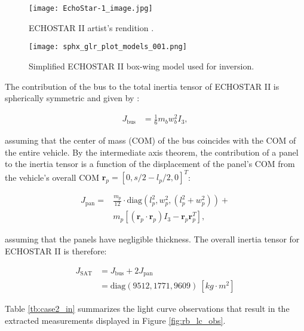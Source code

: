 \documentclass[a4paper,twocolumn]{spaceDebrisC} %
\newcommand{\vctr}[1]{\bm{#1}}
\newcommand{\figbig}[0]{0.5\textwidth}
\begin{document}
\begin{figure}[H]
  \centering
  \texttt{[image: EchoStar-1\_image.jpg]}
  \caption{ECHOSTAR II artist's rendition \cite{as7000_astronautix}.}
  \label{fig:echostar1}
\end{figure}

\begin{figure}[H]
  \centering
  \texttt{[image: sphx\_glr\_plot\_models\_001.png]}
  \caption{Simplified ECHOSTAR II box-wing model used for inversion.}
  \label{fig:echostar1_simple}
\end{figure}

The contribution of the bus to the total inertia tensor of ECHOSTAR II is spherically symmetric and given by \cite{satterly1958}:

\begin{align}
 J_\text{bus} &= \frac{1}{6} m_b w_b^2 I_3,
\end{align}

\noindent
assuming that the center of mass (COM) of the bus coincides with the COM of the entire vehicle. By the intermediate axis theorem, the contribution of a panel to the inertia tensor is a function of the displacement of the panel's COM from the vehicle's overall COM $\vctr{r}_p = [ 0, s/2 - l_p/2, 0]^T$:

\begin{equation}
  \begin{split}
 J_\text{pan} = &\frac{m_p}{12} \cdot \text{diag}\left(l_p^2, w_p^2, \left(l_p^2 + w_p^2\right) \right) + \\&m_p \left[ \left( \vctr{r}_p \cdot \vctr{r}_p \right) I_3 - \vctr{r}_p \vctr{r}_p^T \right],
  \end{split}
\end{equation}

\noindent
assuming that the panels have negligible thickness. The overall inertia tensor for ECHOSTAR II is therefore:

\begin{align}
 J_\text{SAT} &= J_\text{bus} + 2J_\text{pan} \\
  &= \text{diag} \left( 9512, 1771, 9609 \right) \: [kg \cdot m^2]
\end{align}

Table \ref{tb:case2_in} summarizes the light curve observations that result in the extracted measurements displayed in Figure \ref{fig:rb_lc_obs}.
\end{document}
